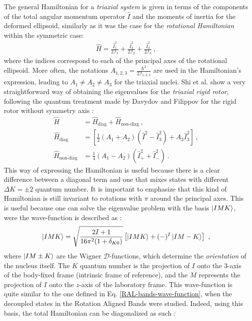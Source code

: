 The general Hamiltonian for a \emph{triaxial system} is given in terms of the components of the total angular momentum operator $\hat{I}$ and the moments of inertia for the deformed ellipsoid, similarly as it was the case for the \emph{rotational Hamiltonian} within the symmetric case:
\begin{align}
    \hat{H}=\frac{\hat{I}_1^2}{2\mathcal{I}_1}+\frac{\hat{I}_2^2}{2\mathcal{I}_2}+\frac{\hat{I}_3^2}{2\mathcal{I}_3}\ ,
    \label{general-rotor-hamiltonian}
\end{align}
where the indices correspond to each of the principal axes of the rotational ellipsoid.
More often, the notations $A_{1,2,3}=\frac{\hbar^2}{2\mathcal{I}_{1,2,3}}$ are used in the Hamiltonian's expression, leading to $A_1\neq A_2\neq A_3$ for the triaxial nuclei. Shi et al. \cite{wen2015wobbling} show a very straightforward way of obtaining the eigenvalues for the \emph{triaxial rigid rotor}, following the quantum treatment made by Davydov and Filippov for the rigid rotor without symmetry axis \cite{davydov1958rotational}:
\begin{align}
    \hat{H}&=\hat{H}_\text{diag}+\hat{H}_\text{non-diag}\ ,\nonumber\\
    \hat{H}_\text{diag}&=\left[\frac{1}{2}\left(A_1+A_2\right)\left(\hat{I}^2-\hat{I}_3^2\right)+A_3\hat{I}_3^2\right]\ ,\nonumber\\
    \hat{H}_\text{non-diag}&=\frac{1}{4}\left(A_1-A_2\right)\left(\hat{I}_+^2+\hat{I}_-^2\right)\ .
\end{align}
This way of expressing the Hamiltonian is useful because there is a clear difference between a diagonal term and one that mixes states with different $\Delta K=\pm2$ quantum number. It is important to emphasize that this kind of Hamiltonian is still invariant to rotations with $\pi$ around the principal axes. This is useful because one can solve the eigenvalue problem with the basis $\ket{IMK}$, were the wave-function is described as \cite{wen2015wobbling}:
\begin{align}
    \ket{IMK}=\sqrt{\frac{2I+1}{16\pi^2(1+\delta_{K0})}}\left[\ket{IMK}+(-)^I\ket{IM-K}\right]\ ,
\end{align}
where $\ket{IM\pm K}$ are the Wigner $\mathcal{D}$-functions, which determine the \emph{orientation} of the nucleus itself. The $K$ quantum number is the projection of $I$ onto the 3-axis of the body-fixed frame (intrinsic frame of reference), and the $M$ represents the projection of $I$ onto the $z$-axis of the laboratory frame. This wave-function is quite similar to the one defined in Eq. \ref{RAL-bands-wave-function}, when the decoupled states in the Rotation Aligned Bands were studied. Indeed, using this basis, the total Hamiltonian can be diagonalized as such \cite{wen2015wobbling}:
